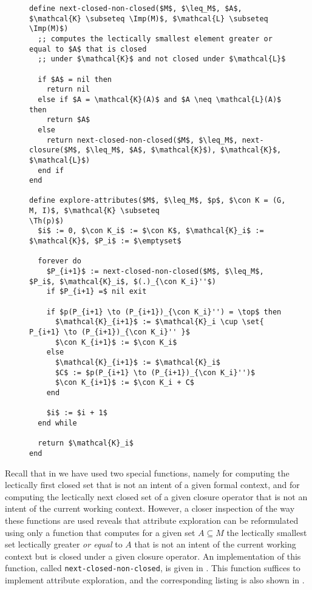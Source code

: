 \begin{figure}[tp]
  \begin{Algorithm}
  \label{alg:explore-attributes-with-next-closed-none-closed}
  \hspace*{0cm}
\begin{lstlisting}
define next-closed-non-closed($M$, $\leq_M$, $A$, $\mathcal{K} \subseteq \Imp(M)$, $\mathcal{L} \subseteq \Imp(M)$)
  ;; computes the lectically smallest element greater or equal to $A$ that is closed
  ;; under $\mathcal{K}$ and not closed under $\mathcal{L}$

  if $A$ = nil then
    return nil
  else if $A = \mathcal{K}(A)$ and $A \neq \mathcal{L}(A)$ then
    return $A$
  else
    return next-closed-non-closed($M$, $\leq_M$, next-closure($M$, $\leq_M$, $A$, $\mathcal{K}$), $\mathcal{K}$, $\mathcal{L}$)
  end if
end

define explore-attributes($M$, $\leq_M$, $p$, $\con K = (G, M, I)$, $\mathcal{K} \subseteq
\Th(p)$)
  $i$ := 0, $\con K_i$ := $\con K$, $\mathcal{K}_i$ := $\mathcal{K}$, $P_i$ := $\emptyset$

  forever do
    $P_{i+1}$ := next-closed-non-closed($M$, $\leq_M$, $P_i$, $\mathcal{K}_i$, $(.)_{\con K_i}''$)
    if $P_{i+1} =$ nil exit

    if $p(P_{i+1} \to (P_{i+1})_{\con K_i}'') = \top$ then
      $\mathcal{K}_{i+1}$ := $\mathcal{K}_i \cup \set{ P_{i+1} \to (P_{i+1})_{\con K_i}'' }$
      $\con K_{i+1}$ := $\con K_i$
    else
      $\mathcal{K}_{i+1}$ := $\mathcal{K}_i$
      $C$ := $p(P_{i+1} \to (P_{i+1})_{\con K_i}'')$
      $\con K_{i+1}$ := $\con K_i + C$
    end

    $i$ := $i + 1$
  end while

  return $\mathcal{K}_i$  
end
\end{lstlisting}
  \end{Algorithm}
\end{figure}

Recall that in  we have used two special functions, namely
for computing the lectically first closed set that is not an intent of a given formal
context, and for computing the lectically next closed set of a given closure operator that
is not an intent of the current working context.  However, a closer inspection of the way
these functions are used reveals that attribute exploration can be reformulated using only
a function that computes for a given set $A \subseteq M$ the lectically smallest set
lectically greater \emph{or equal} to $A$ that is not an intent of the current working
context but is closed under a given closure operator.  An implementation of this function,
called \lstinline{next-closed-non-closed}, is given in
.  This function suffices to
implement attribute exploration, and the corresponding listing is also shown in
.

